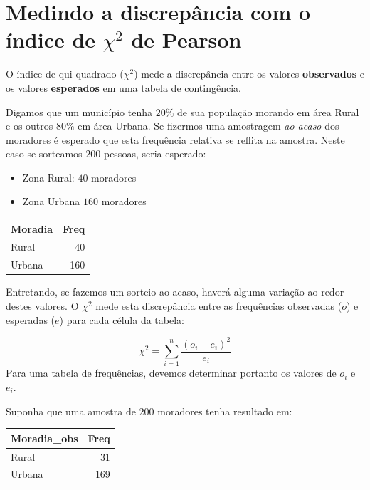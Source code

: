 \documentclass[
]{book}
\begin{document}
\hypertarget{medindo-a-discrepuxe2ncia-com-o-uxedndice-de-chi2-de-pearson}{%
\section{\texorpdfstring{Medindo a discrepância com o índice de \(\chi^2\) de Pearson}{Medindo a discrepância com o índice de \textbackslash chi\^{}2 de Pearson}}\label{medindo-a-discrepuxe2ncia-com-o-uxedndice-de-chi2-de-pearson}}

O índice de qui-quadrado (\(\chi^2\)) mede a discrepância entre os valores \textbf{observados} e os valores \textbf{esperados} em uma tabela de contingência.

Digamos que um município tenha \(20\%\) de sua população morando em área Rural e os outros \(80\%\) em área Urbana. Se fizermos uma amostragem \emph{ao acaso} dos moradores é esperado que esta frequência relativa se reflita na amostra. Neste caso se sorteamos \(200\) pessoas, seria esperado:

\begin{itemize}
\item
  Zona Rural: \(40\) moradores
\item
  Zona Urbana \(160\) moradores
\end{itemize}

\begin{tabular}{l|r}
\hline
Moradia & Freq\\
\hline
Rural & 40\\
\hline
Urbana & 160\\
\hline
\end{tabular}

Entretando, se fazemos um sorteio ao acaso, haverá alguma variação ao redor destes valores. O \(\chi^2\) mede esta discrepância entre as frequências observadas (\(o\)) e esperadas (\(e\)) para cada célula da tabela:

\[\chi^2 = \sum_{i=1}^{n}\frac{(o_i - e_i)^2}{e_i}\]
Para uma tabela de frequências, devemos determinar portanto os valores de \(o_i\) e \(e_i\).

Suponha que uma amostra de \(200\) moradores tenha resultado em:

\begin{tabular}{l|r}
\hline
Moradia\_obs & Freq\\
\hline
Rural & 31\\
\hline
Urbana & 169\\
\hline
\end{tabular}
\end{document}
